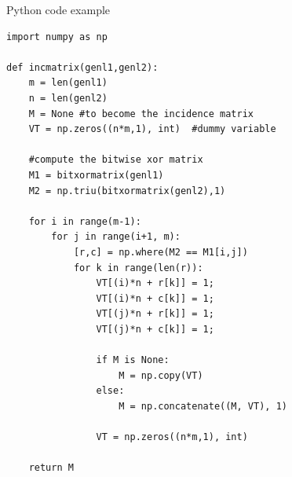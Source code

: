 \documentclass[a4paper]{article}
\begin{document}
\begin{listing}[ht]
\caption{Python code example}
\label{listing:python example}

\begin{verbatim}
import numpy as np
    
def incmatrix(genl1,genl2):
    m = len(genl1)
    n = len(genl2)
    M = None #to become the incidence matrix
    VT = np.zeros((n*m,1), int)  #dummy variable
    
    #compute the bitwise xor matrix
    M1 = bitxormatrix(genl1)
    M2 = np.triu(bitxormatrix(genl2),1) 
    
    for i in range(m-1):
        for j in range(i+1, m):
            [r,c] = np.where(M2 == M1[i,j])
            for k in range(len(r)):
                VT[(i)*n + r[k]] = 1;
                VT[(i)*n + c[k]] = 1;
                VT[(j)*n + r[k]] = 1;
                VT[(j)*n + c[k]] = 1;
    
                if M is None:
                    M = np.copy(VT)
                else:
                    M = np.concatenate((M, VT), 1)
    
                VT = np.zeros((n*m,1), int)
    
    return M
\end{verbatim}
\end{listing}

\medskip

\printbibliography[heading=bibintoc]
\end{document}
